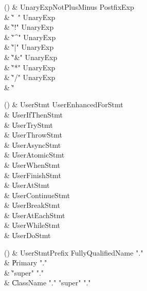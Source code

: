 \begin{bbgrammarappendix}{3.0in}

() & UnaryExpNotPlusMinus \label{prod:UnaryExpNotPlusMinus}  \: PostfixExp  \\

 &    \| \xcd"~" UnaryExp \\
 &    \| \xcd"!" UnaryExp \\
 &    \| \xcd"^" UnaryExp \\
 &    \| \xcd"|" UnaryExp \\
 &    \| \xcd"&" UnaryExp \\
 &    \| \xcd"*" UnaryExp \\
 &    \| \xcd"/" UnaryExp \\
 &    \| \xcd"%

\end{bbgrammarappendix}

\begin{bbgrammarappendix}{3.8in}

() & UserStmt \label{prod:UserStmt}  \:
         UserEnhancedForStmt \\
 &    \| UserIfThenStmt \\
 &    \| UserTryStmt \\
 &    \| UserThrowStmt \\
 &    \| UserAsyncStmt \\
 &    \| UserAtomicStmt \\
 &    \| UserWhenStmt \\
 &    \| UserFinishStmt \\
 &    \| UserAtStmt \\
 &    \| UserContinueStmt \\
 &    \| UserBreakStmt \\
 &    \| UserAtEachStmt \\
 &    \| UserWhileStmt \\
 &    \| UserDoStmt \\

\end{bbgrammarappendix}

\begin{bbgrammarappendix}{3.8in}

() & UserStmtPrefix \label{prod:UserStmtPrefix}  \:
         FullyQualifiedName \xcd"." \\
 &    \| Primary \xcd"." \\
 &    \| \xcd"super" \xcd"." \\
 &    \| ClassName \xcd"." \xcd"super" \xcd"." \\

\end{bbgrammarappendix}

